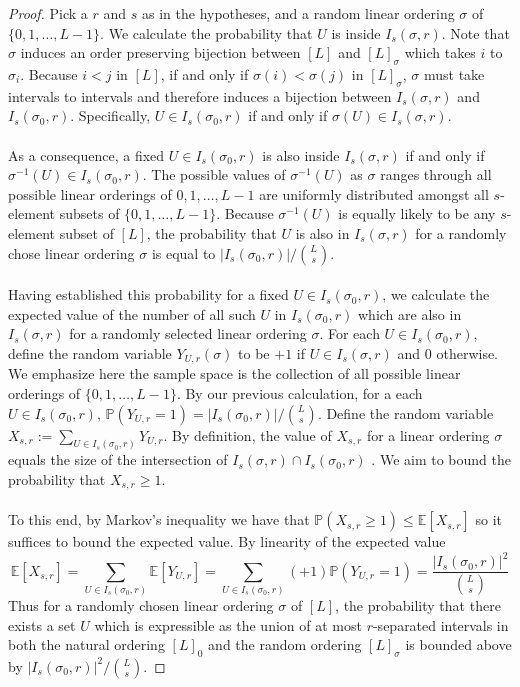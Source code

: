 \documentclass[11pt,a4paper]{amsart}
\theoremstyle{definition}
\theoremstyle{remark}
\newcommand{\Fpr}{\mathbb{P}}
\begin{document}
\begin{proof}
Pick a $r$ and $s$ as in the hypotheses, and a random linear ordering $\sigma$ of $\{0,1,\hdots, L-1\}$.  We calculate the probability that $U$ is inside $I_{s}(\sigma,r)$.  Note that $\sigma$ induces an order preserving bijection between $[L]$ and $[L]_{\sigma}$ which takes $i$ to $\sigma_{i}$.  Because $i < j$ in $[L]$, if and only if $\sigma(i) < \sigma(j)$ in $[L]_{\sigma}$, $\sigma$ must take intervals to intervals and therefore induces a bijection between $I_{s}(\sigma,r)$ and $I_{s}(\sigma_{0},r)$.  Specifically, $U \in I_{s}(\sigma_{0},r)$ if and only if $\sigma(U) \in I_{s}(\sigma,r)$.  
\\
\\
As a consequence, a fixed $U \in I_{s}(\sigma_{0},r)$ is also inside $I_{s}(\sigma,r)$ if and only if $\sigma^{-1}(U) \in I_{s}(\sigma_{0},r)$.  The possible values of $\sigma^{-1}(U)$ as $\sigma$ ranges through all possible linear orderings of ${0,1,\hdots, L-1}$ are uniformly distributed amongst all $s$-element subsets of $\{0,1,\hdots, L-1\}$.  Because $\sigma^{-1}(U)$ is equally likely to be any $s$-element subset of $[L]$, the probability that $U$ is also in $I_{s}(\sigma,r)$ for a randomly chose linear ordering $\sigma$ is equal to $|I_{s}(\sigma_{0},r)|/\binom{L}{s}$. \\
\\
Having established this probability for a fixed $U \in I_{s}(\sigma_{0},r)$, we calculate the expected value of the number of all such $U$ in $I_{s}(\sigma_{0},r)$ which are also in $I_{s}(\sigma,r)$ for a randomly selected linear ordering $\sigma$.  For each $U \in I_{s}(\sigma_{0},r)$, define the random variable $Y_{U,r}(\sigma)$ to be $+1$ if $U \in I_{s}(\sigma,r)$ and $0$ otherwise.  We emphasize here the sample space is the collection of all possible linear orderings of $\{0,1,\hdots, L-1\}$.  By our previous calculation, for a each $U \in I_{s}(\sigma_{0},r)$, $\Fpr(Y_{U,r} = 1) = |I_{s}(\sigma_{0},r)|/\binom{L}{s}$.  Define the random variable $X_{s,r} := \sum_{U \in I_{s}(\sigma_{0},r)} Y_{U,r}$.  By definition, the value of $X_{s,r}$ for a linear ordering $\sigma$ equals the size of the intersection of $I_{s}(\sigma,r)\cap I_{s}(\sigma_{0},r)$ .  We aim to bound the probability that $X_{s,r} \geq 1$.  \\
\\
To this end, by Markov's inequality we have that $\Fpr (X_{s,r} \geq 1) \leq \mathbb{E}[X_{s,r}]$ so it suffices to bound the expected value.  By linearity of the expected value 
\begin{equation*}
\mathbb{E}[X_{s,r}] = \sum_{U \in I_{s}(\sigma_{0},r)} \mathbb{E}[Y_{U,r}] = \sum_{U \in I_{s}(\sigma_{0},r)} (+1)\Fpr(Y_{U,r} = 1) = \frac{|I_{s}(\sigma_{0},r)|^{2}}{\binom{L}{s}}
\end{equation*}
Thus for a randomly chosen linear ordering $\sigma$ of $[L]$, the probability that there exists a set $U$ which is expressible as the union of at most $r$-separated intervals in both the natural ordering $[L]_{0}$ and the random ordering $[L]_{\sigma}$ is bounded above by $|I_{s}(\sigma_{0},r)|^{2}/\binom{L}{s}$.
\end{proof}
\end{document}
